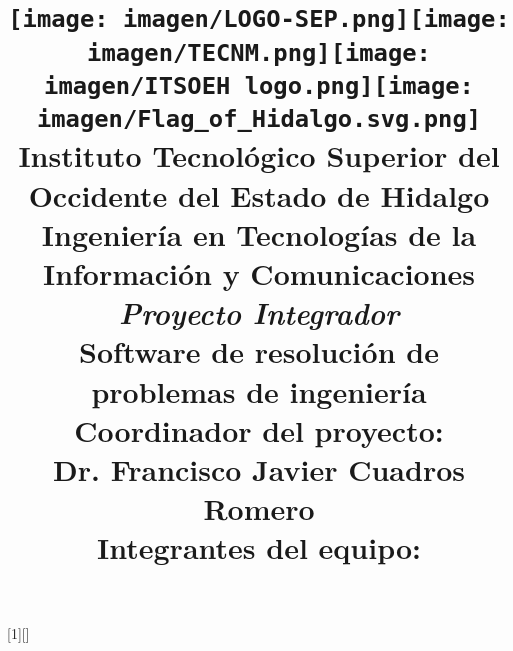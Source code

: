\documentclass[conference]{IEEEtran}
\begin{document}

[1][]
{}
{}


\title{
\texttt{[image: imagen/LOGO-SEP.png]}\texttt{[image: imagen/TECNM.png]}\texttt{[image: imagen/ITSOEH logo.png]}\texttt{[image: imagen/Flag\_of\_Hidalgo.svg.png]}
\\ \vspace*{0.6cm} {\Large Instituto Tecnológico Superior del Occidente del Estado de Hidalgo} \\
  \vspace*{0.2cm}
  \Large Ingeniería en Tecnologías de la Información y Comunicaciones  \\  
  \vspace*{0.5cm}  
  {\it \huge Proyecto Integrador} \\
  {\normalsize Software de resolución de problemas de ingeniería}\\
  {\vspace{1cm} \large \textbf{Coordinador del proyecto:}\\ Dr. Francisco Javier Cuadros Romero}\\
  \vspace{1cm}
  {\large \textbf{Integrantes del equipo:}}
  \vspace{0.5cm}
  }
\end{document}
